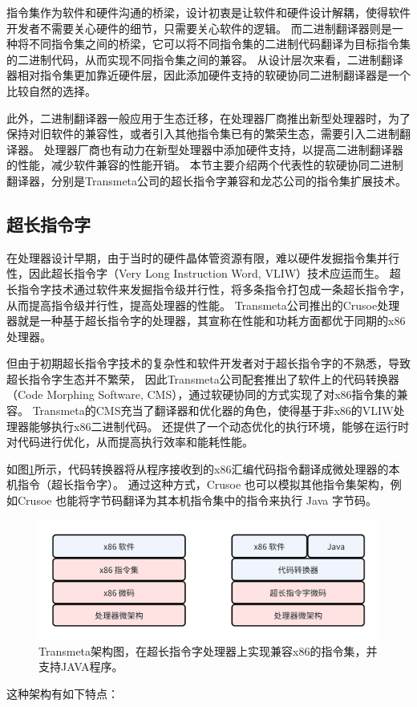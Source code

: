 指令集作为软件和硬件沟通的桥梁，设计初衷是让软件和硬件设计解耦，使得软件开发者不需要关心硬件的细节，只需要关心软件的逻辑。
而二进制翻译器则是一种将不同指令集之间的桥梁，它可以将不同指令集的二进制代码翻译为目标指令集的二进制代码，从而实现不同指令集之间的兼容。
从设计层次来看，二进制翻译器相对指令集更加靠近硬件层，因此添加硬件支持的软硬协同二进制翻译器是一个比较自然的选择。

此外，二进制翻译器一般应用于生态迁移，在处理器厂商推出新型处理器时，为了保持对旧软件的兼容性，或者引入其他指令集已有的繁荣生态，需要引入二进制翻译器。
处理器厂商也有动力在新型处理器中添加硬件支持，以提高二进制翻译器的性能，减少软件兼容的性能开销。
本节主要介绍两个代表性的软硬协同二进制翻译器，分别是Transmeta公司的超长指令字兼容和龙芯公司的指令集扩展技术。

\subsection{超长指令字}

在处理器设计早期，由于当时的硬件晶体管资源有限，难以硬件发掘指令集并行性，因此超长指令字（Very Long Instruction Word, VLIW）技术应运而生。
超长指令字技术通过软件来发掘指令级并行性，将多条指令打包成一条超长指令字，从而提高指令级并行性，提高处理器的性能。
Transmeta公司推出的Crusoe处理器就是一种基于超长指令字的处理器，其宣称在性能和功耗方面都优于同期的x86处理器\cite{dehnertTransmetaCodeMorphing2003}。

但由于初期超长指令字技术的复杂性和软件开发者对于超长指令字的不熟悉，导致超长指令字生态并不繁荣，
因此Transmeta公司配套推出了软件上的代码转换器（Code Morphing Software, CMS），通过软硬协同的方式实现了对x86指令集的兼容。
Transmeta的CMS充当了翻译器和优化器的角色，使得基于非x86的VLIW处理器能够执行x86二进制代码。
还提供了一个动态优化的执行环境，能够在运行时对代码进行优化，从而提高执行效率和能耗性能\cite{dehnertTransmetaCodeMorphing2003}。

如图\ref{img:transmeta_arch}所示，代码转换器将从程序接收到的x86汇编代码指令翻译成微处理器的本机指令（超长指令字）。
通过这种方式，Crusoe 也可以模拟其他指令集架构，例如Crusoe 也能将字节码翻译为其本机指令集中的指令来执行 Java 字节码。

\begin{figure}[!htbp]
    \centering
    \includegraphics[width=0.8\linewidth]{./feishuImage/transmeta_arch.png}
    \caption{Transmeta架构图，在超长指令字处理器上实现兼容x86的指令集，并支持JAVA程序。}
    \label{img:transmeta_arch}
  \end{figure}
这种架构有如下特点：

